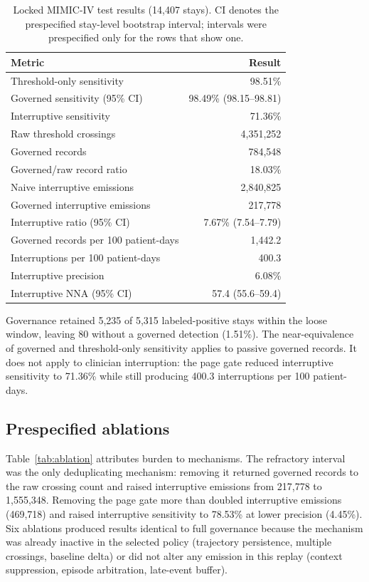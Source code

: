 \documentclass[journal]{IEEEtran}
\begin{document}
\begin{table}[t]
\centering
\caption{Locked MIMIC-IV test results (14,407 stays). CI denotes the
prespecified stay-level bootstrap interval; intervals were prespecified only
for the rows that show one.}
\label{tab:primary}
\footnotesize
\begin{tabular}{p{}r}
\toprule
Metric & Result \\
\midrule
Threshold-only sensitivity & 98.51\% \\
Governed sensitivity (95\% CI) & 98.49\% (98.15--98.81) \\
Interruptive sensitivity & 71.36\% \\
Raw threshold crossings & 4,351,252 \\
Governed records & 784,548 \\
Governed/raw record ratio & 18.03\% \\
Naive interruptive emissions & 2,840,825 \\
Governed interruptive emissions & 217,778 \\
Interruptive ratio (95\% CI) & 7.67\% (7.54--7.79) \\
Governed records per 100 patient-days & 1,442.2 \\
Interruptions per 100 patient-days & 400.3 \\
Interruptive precision & 6.08\% \\
Interruptive NNA (95\% CI) & 57.4 (55.6--59.4) \\
\bottomrule
\end{tabular}
\end{table}

Governance retained 5,235 of 5,315 labeled-positive stays within the loose
window, leaving 80 without a governed detection (1.51\%). The near-equivalence
of governed and threshold-only sensitivity applies to passive governed
records. It does not apply to clinician interruption: the page gate reduced
interruptive sensitivity to 71.36\% while still producing 400.3 interruptions
per 100 patient-days.

\subsection{Prespecified ablations}

Table~\ref{tab:ablation} attributes burden to mechanisms. The refractory
interval was the only deduplicating mechanism: removing it returned governed
records to the raw crossing count and raised interruptive emissions from
217,778 to 1,555,348. Removing the page gate more than doubled interruptive
emissions (469,718) and raised interruptive sensitivity to 78.53\% at lower
precision (4.45\%). Six ablations produced results identical to full
governance because the mechanism was already inactive in the selected policy
(trajectory persistence, multiple crossings, baseline delta) or did not alter
any emission in this replay (context suppression, episode arbitration,
late-event buffer).
\end{document}
